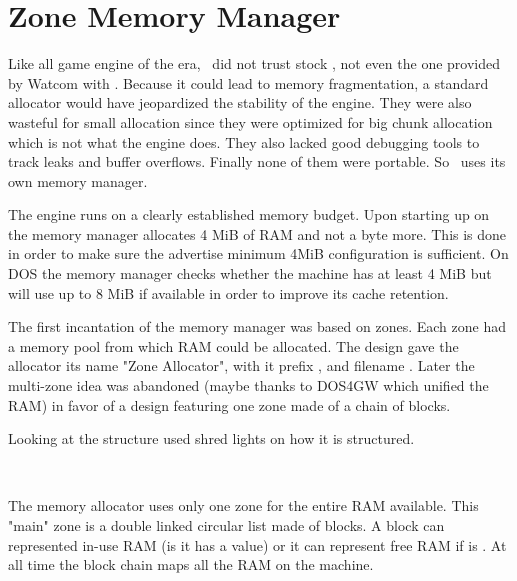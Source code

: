 \section{Zone Memory Manager}
Like all game engine of the era, \doom~did not trust stock , not even the one provided by Watcom with . Because it could lead to memory fragmentation, a standard allocator would have jeopardized the stability of the engine. They were also wasteful for small allocation since they were optimized for big chunk allocation which is not what the engine does. They also lacked good debugging tools to track leaks and buffer overflows. Finally none of them were portable. So \doom~uses its own memory manager.\\
\par

The engine runs on a clearly established memory budget. Upon starting up on \NeXT the memory manager allocates 4 MiB of RAM and not a byte more. This is done in order to make sure the advertise minimum 4MiB configuration is sufficient. On DOS the memory manager checks whether the machine has at least 4 MiB but will use up to 8 MiB if available in order to improve its cache retention.\\
\par
The first incantation of the memory manager was based on zones. Each zone had a memory pool from which RAM could be allocated. The design gave the allocator its name "Zone Allocator", with it prefix , and filename . Later the multi-zone idea was abandoned (maybe thanks to DOS4GW which unified the RAM) in favor of a design featuring one zone made of a chain of blocks.\\
\par
Looking at the structure used shred lights on how it is structured.\\
\par
{}\\
\par
The memory allocator uses only one zone for the entire RAM available. This "main" zone is a double linked circular list made of blocks. A block can represented in-use RAM (is it has a  value) or it can represent free RAM if  is . At all time the block chain maps all the RAM on the machine.



